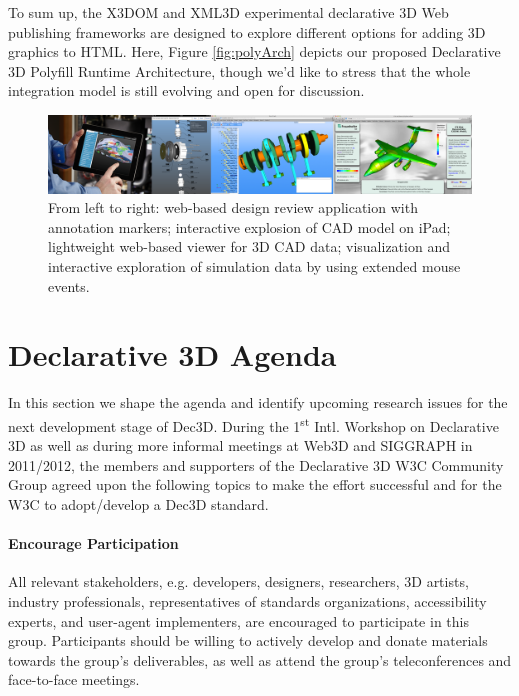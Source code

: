 \documentclass{acmsiggraph}
\begin{document}
To sum up, the X3DOM and XML3D experimental declarative 3D Web publishing frameworks are designed to explore different options for adding 3D graphics to HTML. Here, Figure \ref{fig:polyArch} depicts our proposed Declarative 3D Polyfill Runtime Architecture, though we'd like to stress that the whole integration model is still evolving and open for discussion.

\begin{figure}
  \centering
  \includegraphics[width=1.0\textwidth]{images/cad_apps.png}
  \caption{From left to right: web-based design review application with annotation markers; interactive explosion of CAD model on iPad; lightweight web-based viewer for 3D CAD data; visualization and interactive exploration of simulation data by using extended mouse events.}
  \label{fig:cadApps}
\end{figure}




\section{Declarative 3D Agenda}
\label{sec:Agenda}

In this section we shape the agenda and identify upcoming research issues for the next development stage of Dec3D.
During the 1\textsuperscript{st} Intl. Workshop on Declarative 3D \cite{Dec3D2012} as well as during more informal meetings at Web3D and SIGGRAPH in 2011/2012, the members and supporters of the Declarative 3D W3C Community Group agreed upon the following topics to make the effort successful and for the W3C to adopt/develop a Dec3D standard.

\paragraph{Encourage Participation}
All relevant stakeholders, e.g. developers, designers, researchers, 3D artists, industry professionals, representatives of standards organizations, accessibility experts, and user-agent implementers, are encouraged to participate in this group. Participants should be willing to actively develop and donate materials towards the group's deliverables, as well as attend the group's teleconferences and face-to-face meetings.
\vspace{-0.1cm}
\end{document}
